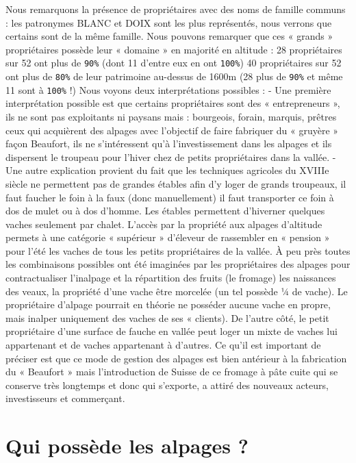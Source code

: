 \documentclass[12pt,a4paper]{report}
\begin{document}
	Nous remarquons la présence de propriétaires avec des noms de famille communs : les patronymes BLANC et DOIX sont les plus représentés, nous verrons que certains sont de la même famille.
	Nous pouvons remarquer que ces « grands » propriétaires possède leur « domaine » en majorité en altitude :
	28 propriétaires sur 52 ont plus de \texttt{90\%} (dont 11 d’entre eux en ont \texttt{100\%})
	40 propriétaires sur 52 ont plus de \texttt{80\%} de leur patrimoine au-dessus de 1600m (28 plus de \texttt{90\%} et même 11 sont à \texttt{100\%} !)
	Nous voyons deux interprétations possibles : 
	-	Une première interprétation possible est que certains propriétaires sont des « entrepreneurs », ils ne sont pas exploitants ni paysans mais : bourgeois, forain, marquis, prêtres ceux qui acquièrent des alpages avec l’objectif de faire fabriquer du « gruyère » façon Beaufort, ils ne s’intéressent qu’à l’investissement dans les alpages et ils dispersent le troupeau pour l’hiver chez de petits propriétaires dans la vallée. 
	-	Une autre explication provient du fait que les techniques agricoles du XVIIIe siècle ne permettent pas de grandes étables afin d’y loger de grands troupeaux, il faut faucher le foin à la faux (donc manuellement) il faut transporter ce foin à dos de mulet ou à dos d’homme. Les étables permettent d’hiverner quelques vaches seulement par chalet. L’accès par la propriété aux alpages d’altitude permets à une catégorie « supérieur » d’éleveur de rassembler en « pension » pour l’été les vaches de tous les petits propriétaires de la vallée.
	À peu près toutes les combinaisons possibles ont été imaginées par les propriétaires des alpages pour contractualiser l’inalpage et la répartition des fruits (le fromage) les naissances des veaux, la propriété d’une vache être morcelée (un tel possède ¼ de vache). Le propriétaire d’alpage pourrait en théorie ne posséder aucune vache en propre, mais inalper uniquement des vaches de ses « clients). De l’autre côté, le petit propriétaire d’une surface de fauche en vallée peut loger un mixte de vaches lui appartenant et de vaches appartenant à d’autres. 
	Ce qu’il est important de préciser est que ce mode de gestion des alpages est bien antérieur à la fabrication du « Beaufort » mais l’introduction de Suisse de ce fromage à pâte cuite qui se conserve très longtemps et donc qui s’exporte, a attiré des nouveaux acteurs, investisseurs et commerçant.
	
	
	
\section{Qui possède les alpages ?}
\end{document}
